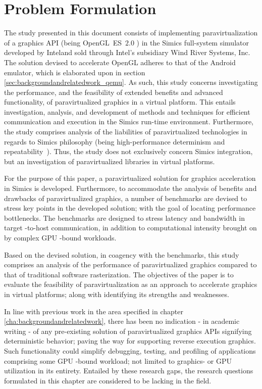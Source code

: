 
\section{Problem Formulation}
\label{sec:problemformulation}
The study presented in this document consists of implementing paravirtualization of a graphics API (being OpenGL~ES~$2.0$ ) in the Simics full-system simulator developed by Intel\circledR and sold through Intel\circledR 's subsidiary Wind River Systems, Inc. 
The solution devised to accelerate OpenGL adheres to that of the Android emulator, which is elaborated upon in section \ref{sec:backgroundandrelatedwork_qemu}.
As such, this study concerns investigating the performance, and the feasibility of extended benefits and advanced functionality, of paravirtualized graphics in a virtual platform.
This entails investigation, analysis, and development of methods and techniques for efficient communication and execution in the Simics run-time environment.
Furthermore, the study comprises analysis of the liabilities of paravirtualized technologies in regards to Simics philosophy (being high-performance determinism and repeatability~).
Thus, the study does not exclusively concern Simics integration, but an investigation of paravirtualized libraries in virtual platforms.

For the purpose of this paper, a paravirtualized solution for graphics acceleration in Simics is developed.
Furthermore, to accommodate the analysis of benefits and drawbacks of paravirtualized graphics, a number of benchmarks are devised to stress key points in the developed solution; with the goal of locating performance bottlenecks.
The benchmarks are designed to stress latency and bandwidth in target -to-host communication, in addition to computational intensity brought on by complex GPU -bound workloads.

Based on the devised solution, in coagency with the benchmarks, this study comprises an analysis of the performance of paravirtualized graphics compared to that of traditional software rasterization.
The objectives of the paper is to evaluate the feasibility of paravirtualization as an approach to accelerate graphics in virtual platforms; along with identifying its strengths and weaknesses.

In line with previous work in the area specified in chapter \ref{cha:backgroundandrelatedwork}, there has been no indication - in academic writing - of any pre-existing solution of paravirtualized graphics APIs signifying deterministic behavior; paving the way for supporting reverse execution graphics.
Such functionality could simplify debugging, testing, and profiling of applications comprising some GPU -bound workload; not limited to graphics- or GPU utilization in its entirety.
Entailed by these research gaps, the research questions formulated in this chapter are considered to be lacking in the field.

